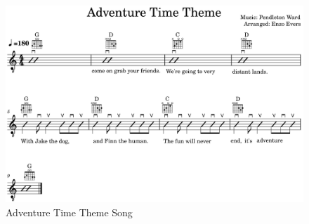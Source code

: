 \begin{figure}[h]
	\centering
	\includegraphics[width=\textwidth]{../../MuseScore/Guitar/GuitarAdventureTimeTheme.png}
	\caption{Adventure Time Theme Song}
	\label{fig:guitar_adventure_time}
\end{figure}